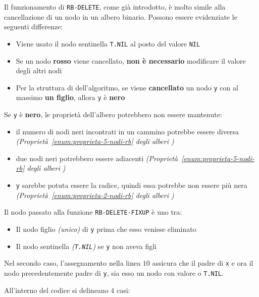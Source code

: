 \documentclass[italian, 10pt]{article}
\begin{document}
\bigskip
Il funzionamento di \texttt{RB-DELETE}, come già introdotto, è molto simile alla cancellazione di un nodo in un albero binario.
Possono essere evidenziate le seguenti differenze:

\begin{itemize}
  \item Viene usato il nodo sentinella \texttt{T.NIL} al posto del valore \texttt{NIL}
  \item Se un nodo \textbf{rosso} viene cancellato, \textbf{non è necessario} modificare il valore degli altri nodi
  \item Per la struttura di dell'algoritmo, se viene \textbf{cancellato} un nodo \texttt{y} con al massimo \textbf{un figlio}, allora \texttt{y} è \textbf{nero}
\end{itemize}

Se \texttt{y} è \textbf{nero}, le proprietà dell'albero \RB potrebbero non essere mantenute:

\begin{itemize}
  \item il numero di nodi neri incontrati in un cammino potrebbe essere diversa \textit{(Proprietà~\ref{enum:proprieta-5-nodi-rb} degli alberi \RB)}
  \item due nodi neri potrebbero essere adiacenti \textit{(Proprietà~\ref{enum:proprieta-5-nodi-rb} degli alberi \RB)}
  \item \texttt{y} sarebbe potuta essere la radice, quindi essa potrebbe non essere più nera \textit{(Proprietà~\ref{enum:proprieta-2-nodi-rb} degli alberi \RB)}
\end{itemize}

\bigskip
Il nodo passato alla funzione \texttt{RB-DELETE-FIXUP} è uno tra:

\begin{itemize}
  \item Il nodo figlio \textit{(unico)} di \texttt{y} prima che esso venisse eliminato
  \item Il nodo sentinella \textit{(\texttt{T.NIL})} se \texttt{y} non aveva figli
\end{itemize}

Nel secondo caso, l'assegnamento nella linea \(10\) assicura che il padre di \texttt{x} e ora il nodo precedentemente padre di \texttt{y}, sia esso un nodo con valore o \texttt{T.NIL}.

All'interno del codice si delineano \(4\) casi:
\end{document}
